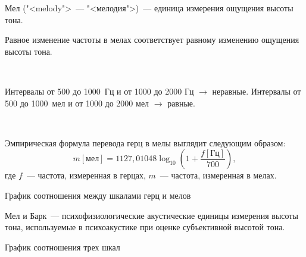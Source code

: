 \documentclass{beamer}
\begin{document}
\begin{frame}
\begin{block}{Мел}
("<melody">~--- "<мелодия">)~--- единица измерения ощущения высоты тона. 
\end{block}

Равное изменение частоты в мелах соответствует равному изменению ощущения высоты тона. 

~

Интервалы от 500 до 1000~Гц и от 1000 до 2000 Гц $\rightarrow$ неравные. 
Интервалы от 500 до 1000~мел и от 1000 до 2000 мел $\rightarrow$ равные. 

~

Эмпирическая формула перевода герц в мелы выглядит следующим образом:
\[ m[\text{мел}]=1127,01048 \log_{10}(1+\frac{f[\text{Гц}]}{700}),\]
где \(f\)~--- частота, измеренная в герцах, \(m\)~--- частота, измеренная в мелах.
\end{frame}

\begin{frame}
\begin{block}{График соотношения между шкалами герц и мелов}
\end{block}
\end{frame}

\begin{frame}
Мел и Барк~--- психофизиологические акустические единицы измерения высоты тона, используемые в психоакустике при оценке субъективной высотой тона. 
\begin{block}{График соотношения трех шкал}
\end{block}
\end{frame}
\end{document}
